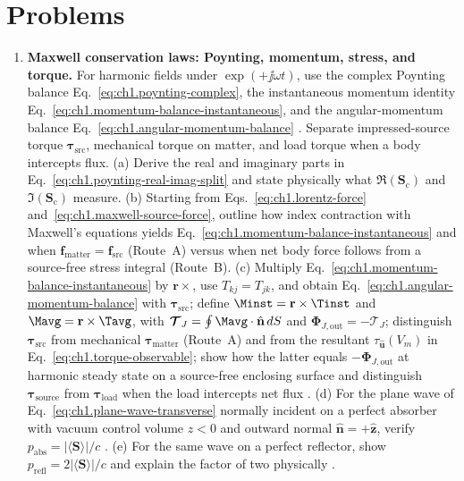\section{Problems}
\label{sec:ch01.8}

\begin{enumerate}
\item \textbf{Maxwell conservation laws: Poynting, momentum, stress, and torque.}
For harmonic fields under $\exp(+\jj\omega t)$, use the complex Poynting balance Eq.~\eqref{eq:ch1.poynting-complex}, the instantaneous momentum identity Eq.~\eqref{eq:ch1.momentum-balance-instantaneous}, and the angular-momentum balance Eq.~\eqref{eq:ch1.angular-momentum-balance} \cite{poynting1884,maxwell1873,stratton1941}. Separate impressed-source torque $\boldsymbol{\tau}_{\mathrm{src}}$, mechanical torque on matter, and load torque when a body intercepts flux.
(a) Derive the real and imaginary parts in Eq.~\eqref{eq:ch1.poynting-real-imag-split} and state physically what $\Re(\mathbf{S}_\mathrm{c})$ and $\Im(\mathbf{S}_\mathrm{c})$ measure.
(b) Starting from Eqs.~\eqref{eq:ch1.lorentz-force} and~\eqref{eq:ch1.maxwell-source-force}, outline how index contraction with Maxwell's equations yields Eq.~\eqref{eq:ch1.momentum-balance-instantaneous} and when $\mathbf{f}_{\mathrm{matter}}=\mathbf{f}_{\mathrm{src}}$ (Route~A) versus when net body force follows from a source-free stress integral (Route~B).
(c) Multiply Eq.~\eqref{eq:ch1.momentum-balance-instantaneous} by $\mathbf{r}\times$, use $T_{kj}=T_{jk}$, and obtain Eq.~\eqref{eq:ch1.angular-momentum-balance} with $\boldsymbol{\tau}_{\mathrm{src}}$; define $\Minst=\mathbf{r}\times\Tinst$ and $\Mavg=\mathbf{r}\times\Tavg$, with $\boldsymbol{\mathcal{T}}_J=\oint\Mavg\cdot\hat{\mathbf{n}}\,dS$ and $\boldsymbol{\Phi}_{J,\mathrm{out}}=-\boldsymbol{\mathcal{T}}_J$; distinguish $\boldsymbol{\tau}_{\mathrm{src}}$ from mechanical $\boldsymbol{\tau}_{\mathrm{matter}}$ (Route~A) and from the resultant $\tau_{\hat{\mathbf{u}}}(V_m)$ in Eq.~\eqref{eq:ch1.torque-observable}; show how the latter equals $-\boldsymbol{\Phi}_{J,\mathrm{out}}$ at harmonic steady state on a source-free enclosing surface and distinguish $\boldsymbol{\tau}_{\mathrm{source}}$ from $\boldsymbol{\tau}_{\mathrm{load}}$ when the load intercepts net flux \cite{beth1936}.
(d) For the plane wave of Eq.~\eqref{eq:ch1.plane-wave-transverse} normally incident on a perfect absorber with vacuum control volume $z<0$ and outward normal $\hat{\mathbf{n}}=+\hat{\mathbf{z}}$, verify $p_{\mathrm{abs}}=|\langle\mathbf{S}\rangle|/c$ \cite{stratton1941}.
(e) For the same wave on a perfect reflector, show $p_{\mathrm{refl}}=2|\langle\mathbf{S}\rangle|/c$ and explain the factor of two physically \cite{maxwell1873,stratton1941}.


\end{enumerate}
